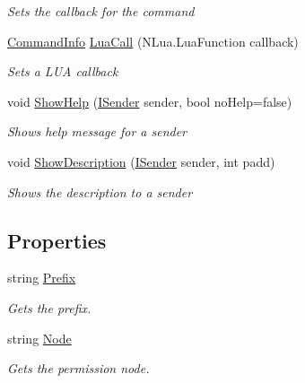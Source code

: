 \begin{DoxyCompactItemize}
\begin{DoxyCompactList}\small\item\em Sets the callback for the command \end{DoxyCompactList}\item 
\hyperlink{class_o_t_a_1_1_command_1_1_command_info}{Command\+Info} \hyperlink{class_o_t_a_1_1_command_1_1_command_info_a2108c70a368f22d3985cf3cb978275e0}{Lua\+Call} (N\+Lua.\+Lua\+Function callback)
\begin{DoxyCompactList}\small\item\em Sets a L\+U\+A callback \end{DoxyCompactList}\item 
void \hyperlink{class_o_t_a_1_1_command_1_1_command_info_af2157881e8d1308d022a4fa9f2a56ac9}{Show\+Help} (\hyperlink{interface_o_t_a_1_1_command_1_1_i_sender}{I\+Sender} sender, bool no\+Help=false)
\begin{DoxyCompactList}\small\item\em Shows help message for a sender \end{DoxyCompactList}\item 
void \hyperlink{class_o_t_a_1_1_command_1_1_command_info_a4a924c48f10e7af95cd13ff14ff9a756}{Show\+Description} (\hyperlink{interface_o_t_a_1_1_command_1_1_i_sender}{I\+Sender} sender, int padd)
\begin{DoxyCompactList}\small\item\em Shows the description to a sender \end{DoxyCompactList}\end{DoxyCompactItemize}
\subsection*{Properties}
\begin{DoxyCompactItemize}
\item 
string \hyperlink{class_o_t_a_1_1_command_1_1_command_info_a7b0530400298e30d56643002dc27da4b}{Prefix}
\begin{DoxyCompactList}\small\item\em Gets the prefix. \end{DoxyCompactList}\item 
string \hyperlink{class_o_t_a_1_1_command_1_1_command_info_ae9537928af7e17583d46d8535c9743c9}{Node}
\begin{DoxyCompactList}\small\item\em Gets the permission node. \end{DoxyCompactList}\end{DoxyCompactItemize}


